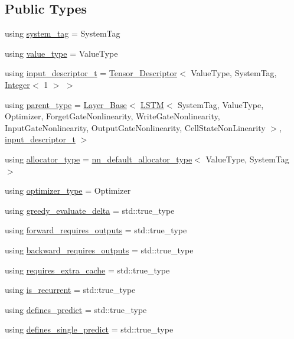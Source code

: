 \subsection*{Public Types}
\begin{DoxyCompactItemize}
\item 
using \hyperlink{structbc_1_1nn_1_1LSTM_a6a485b17d877d63d1fad2698584eb478}{system\+\_\+tag} = System\+Tag
\item 
using \hyperlink{structbc_1_1nn_1_1LSTM_a4f4948a22b62ff7975968bb2d38e79a2}{value\+\_\+type} = Value\+Type
\item 
using \hyperlink{structbc_1_1nn_1_1LSTM_aab44654006b4410cc4a26d2a592776e1}{input\+\_\+descriptor\+\_\+t} = \hyperlink{structbc_1_1nn_1_1Tensor__Descriptor}{Tensor\+\_\+\+Descriptor}$<$ Value\+Type, System\+Tag, \hyperlink{structbc_1_1traits_1_1Integer}{Integer}$<$ 1 $>$ $>$
\item 
using \hyperlink{structbc_1_1nn_1_1LSTM_af5aae30f99bb8b7706a748e660ba2975}{parent\+\_\+type} = \hyperlink{structbc_1_1nn_1_1Layer__Base}{Layer\+\_\+\+Base}$<$ \hyperlink{structbc_1_1nn_1_1LSTM}{L\+S\+TM}$<$ System\+Tag, Value\+Type, Optimizer, Forget\+Gate\+Nonlinearity, Write\+Gate\+Nonlinearity, Input\+Gate\+Nonlinearity, Output\+Gate\+Nonlinearity, Cell\+State\+Non\+Linearity $>$, \hyperlink{structbc_1_1nn_1_1LSTM_aab44654006b4410cc4a26d2a592776e1}{input\+\_\+descriptor\+\_\+t} $>$
\item 
using \hyperlink{structbc_1_1nn_1_1LSTM_a860169e34fe01e7c9faef6186353f856}{allocator\+\_\+type} = \hyperlink{namespacebc_1_1nn_a0025752fc3f47f988b3fae106c825860}{nn\+\_\+default\+\_\+allocator\+\_\+type}$<$ Value\+Type, System\+Tag $>$
\item 
using \hyperlink{structbc_1_1nn_1_1LSTM_adc4d4ca749708bacc70cf57547fd5c08}{optimizer\+\_\+type} = Optimizer
\item 
using \hyperlink{structbc_1_1nn_1_1LSTM_aa147016269d4e28e85e6ecfa224be9e0}{greedy\+\_\+evaluate\+\_\+delta} = std\+::true\+\_\+type
\item 
using \hyperlink{structbc_1_1nn_1_1LSTM_a0ed3ef008dd514399c0ad36e2093a47f}{forward\+\_\+requires\+\_\+outputs} = std\+::true\+\_\+type
\item 
using \hyperlink{structbc_1_1nn_1_1LSTM_aeb7cbe9394df31133663bd53c98650b7}{backward\+\_\+requires\+\_\+outputs} = std\+::true\+\_\+type
\item 
using \hyperlink{structbc_1_1nn_1_1LSTM_af443096fc604c2d9e06122298b9b0c8b}{requires\+\_\+extra\+\_\+cache} = std\+::true\+\_\+type
\item 
using \hyperlink{structbc_1_1nn_1_1LSTM_a55f56b2edacabda8d983e77692c03096}{is\+\_\+recurrent} = std\+::true\+\_\+type
\item 
using \hyperlink{structbc_1_1nn_1_1LSTM_af773cc2ae3cf395af8ce9e921db39ba1}{defines\+\_\+predict} = std\+::true\+\_\+type
\item 
using \hyperlink{structbc_1_1nn_1_1LSTM_adaf632d0c0b59449d7e4c2885abf96a8}{defines\+\_\+single\+\_\+predict} = std\+::true\+\_\+type
\end{DoxyCompactItemize}
